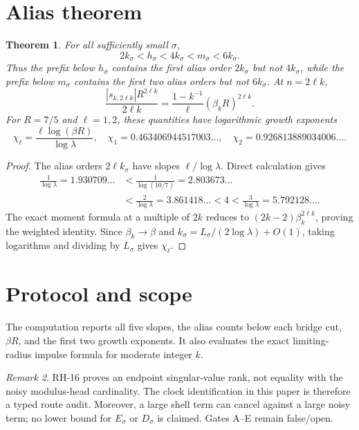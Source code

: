\documentclass[11pt]{article}
\newtheorem{theorem}{Theorem}[section]
\theoremstyle{remark}\newtheorem{remark}[theorem]{Remark}
\begin{document}
\section{Alias theorem}
\begin{theorem}\label{thm:aliases}
For all sufficiently small $\sigma$,
\[
 2k_\sigma<h_\sigma<4k_\sigma<m_\sigma<6k_\sigma.
\]
Thus the prefix below $h_\sigma$ contains the first alias order $2k_\sigma$
but not $4k_\sigma$, while the prefix below $m_\sigma$ contains the first two
alias orders but not $6k_\sigma$.  At $n=2\ell k$,
\[
 \frac{|s_{k,2\ell k}|R^{2\ell k}}{2\ell k}
 =\frac{1-k^{-1}}{\ell}(\beta_kR)^{2\ell k}.
\]
For $R=7/5$ and $\ell=1,2$, these quantities have logarithmic growth
exponents
\[
 \chi_\ell=
 \frac{\ell\log(\beta R)}{\log\lambda},
\quad
 \chi_1=0.463406944517003\ldots,\quad
 \chi_2=0.926813889034006\ldots.
\]
\end{theorem}
\begin{proof}
The alias orders $2\ell k_\sigma$ have slopes
$\ell/\log\lambda$.  Direct calculation gives
\[
\begin{aligned}
 \frac1{\log\lambda}=1.930709\ldots
 &<\frac1{\log(10/7)}=2.803673\ldots\\
 &<\frac2{\log\lambda}=3.861418\ldots
 <4<\frac3{\log\lambda}=5.792128\ldots.
\end{aligned}
\]
The exact moment formula at a multiple of $2k$ reduces to
$(2k-2)\beta_k^{2\ell k}$, proving the weighted identity.  Since
$\beta_k\to\beta$ and
$k_\sigma=L_\sigma/(2\log\lambda)+O(1)$, taking logarithms and dividing by
$L_\sigma$ gives $\chi_\ell$.
\end{proof}

\section{Protocol and scope}
The computation reports all five slopes, the alias counts below each bridge
cut, $\beta R$, and the first two growth exponents.  It also evaluates the
exact limiting-radius impulse formula for moderate integer $k$.

\begin{remark}
RH-16 proves an endpoint singular-value rank, not equality with the noisy
modulus-head cardinality.  The clock identification in this paper is
therefore a typed route audit.  Moreover, a large shell term can cancel
against a large noisy term; no lower bound for $E_\sigma$ or $D_\sigma$ is
claimed.  Gates A--E remain false/open.
\end{remark}
\end{document}
